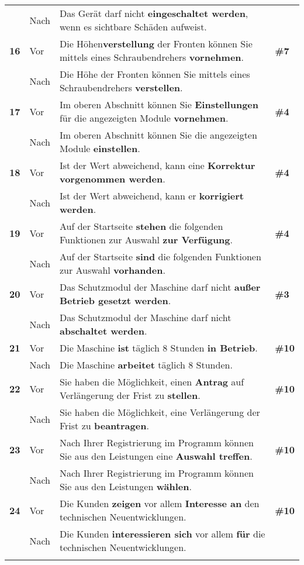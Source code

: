 \begin{longtable}{llp{}l}
& Nach & Das Gerät darf nicht \textbf{eingeschaltet werden}, wenn es sichtbare Schäden aufweist. & \\
\tablevspace
{ \textbf{16}} & Vor & Die Höhen\textbf{verstellung} der Fronten können Sie mittels eines Schraubendrehers \textbf{vornehmen}. & \textbf{\#7}\\
& Nach & Die Höhe der Fronten können Sie mittels eines Schraubendrehers \textbf{verstellen}. & \\
\tablevspace
{ \textbf{17}} & Vor & Im oberen Abschnitt können Sie \textbf{Einstellungen} für die angezeigten Module \textbf{vornehmen}. & \textbf{\#4}\\
& Nach & Im oberen Abschnitt können Sie die angezeigten Module \textbf{einstellen}. & \\
\tablevspace
{ \textbf{18}} & Vor & Ist der Wert abweichend, kann eine \textbf{Korrektur vorgenommen werden}. & \textbf{\#4}\\
& Nach & Ist der Wert abweichend, kann er \textbf{korrigiert werden}. & \\
\tablevspace
{ \textbf{19}} & Vor & Auf der Startseite \textbf{stehen} die folgenden Funktionen zur Auswahl \textbf{zur Verfügung}. & \textbf{\#4}\\
& Nach & Auf der Startseite \textbf{sind} die folgenden Funktionen zur Auswahl \textbf{vorhanden}. & \\
\tablevspace
{ \textbf{20}} & Vor & Das Schutzmodul der Maschine darf nicht \textbf{außer Betrieb gesetzt werden}. & \textbf{\#3}\\
& Nach & Das Schutzmodul der Maschine darf nicht \textbf{abschaltet werden}. & \\
\tablevspace
{ \textbf{21}} & Vor & Die Maschine \textbf{ist} täglich 8 Stunden \textbf{in Betrieb}. & \textbf{\#10}\\
& Nach & Die Maschine \textbf{arbeitet} täglich 8 Stunden. & \\
\tablevspace
{ \textbf{22}} & Vor & Sie haben die Möglichkeit, einen \textbf{Antrag} auf Verlängerung der Frist zu \textbf{stellen}. & \textbf{\#10}\\
& Nach & Sie haben die Möglichkeit, eine Verlängerung der Frist zu \textbf{beantragen}. & \\
\tablevspace
{ \textbf{23}} & Vor & Nach Ihrer Registrierung im Programm können Sie aus den Leistungen eine \textbf{Auswahl treffen}. & \textbf{\#10}\\
& Nach & Nach Ihrer Registrierung im Programm können Sie aus den Leistungen \textbf{wählen}. & \\
\tablevspace
{ \textbf{24}} & Vor & Die Kunden \textbf{zeigen} vor allem \textbf{Interesse an} den technischen Neuentwicklungen. & \textbf{\#10}\\
& Nach & Die Kunden \textbf{interessieren sich} vor allem \textbf{für} die technischen Neuentwicklungen. & \\
\lspbottomrule
\end{longtable}


